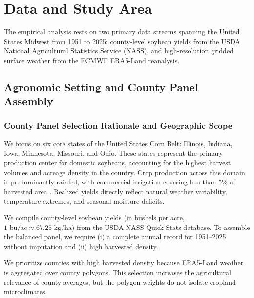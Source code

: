\chapter{Data and Study Area}
\label{chap:data_and_study_area}

The empirical analysis rests on two primary data streams spanning the United States Midwest from 1951 to 2025: county-level soybean yields from the USDA National Agricultural Statistics Service (NASS), and high-resolution gridded surface weather from the ECMWF ERA5-Land reanalysis.


\section{Agronomic Setting and County Panel Assembly}
\label{sec:data_study_area}

\subsection{County Panel Selection Rationale and Geographic Scope}
\label{sec:data_panel_assembly}

We focus on six core states of the United States Corn Belt: Illinois, Indiana, Iowa, Minnesota, Missouri, and Ohio. These states represent the primary production center for domestic soybeans, accounting for the highest harvest volumes and acreage density in the country. Crop production across this domain is predominantly rainfed, with commercial irrigation covering less than 5\% of harvested area \citep{Schlenker2009}. Realized yields directly reflect natural weather variability, temperature extremes, and seasonal moisture deficits.

We compile county-level soybean yields (in bushels per acre, $1\text{ bu/ac} \approx 67.25\text{ kg/ha}$) from the USDA NASS Quick Stats database. To assemble the balanced panel, we require (i) a complete annual record for 1951--2025 without imputation and (ii) high harvested density.

We prioritize counties with high harvested density because ERA5-Land weather is aggregated over county polygons. This selection increases the agricultural relevance of county averages, but the polygon weights do not isolate cropland microclimates.

